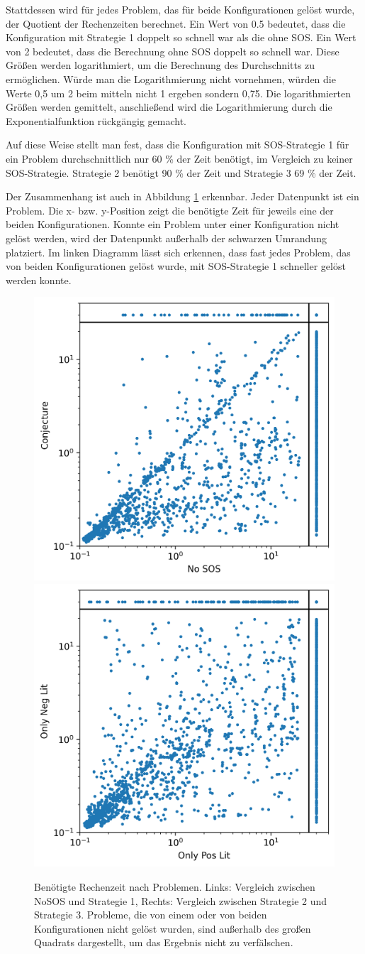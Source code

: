 		Stattdessen wird für jedes Problem, das für beide Konfigurationen gelöst wurde, der Quotient der Rechenzeiten berechnet. Ein Wert von 0.5 bedeutet, dass die Konfiguration mit Strategie 1 doppelt so schnell war als die ohne SOS. Ein Wert von 2 bedeutet, dass die Berechnung ohne SOS doppelt so schnell war. Diese Größen werden logarithmiert, um die Berechnung des Durchschnitts zu ermöglichen. Würde man die Logarithmierung nicht vornehmen, würden die Werte 0,5 um 2 beim mitteln nicht 1 ergeben sondern 0,75. Die logarithmierten Größen werden gemittelt, anschließend wird die Logarithmierung durch die Exponentialfunktion rückgängig gemacht.
		
		Auf diese Weise stellt man fest, dass die Konfiguration mit SOS-Strategie 1 für ein Problem durchschnittlich nur 60 \% der Zeit benötigt, im Vergleich zu keiner SOS-Strategie. Strategie 2 benötigt 90 \% der Zeit und Strategie 3 69 \% der Zeit.
		
		
		Der Zusammenhang ist auch in Abbildung \ref{fig:directcompare} erkennbar. Jeder Datenpunkt ist ein Problem. Die x- bzw. y-Position zeigt die benötigte Zeit für jeweils eine der beiden Konfigurationen. Konnte ein Problem unter einer Konfiguration nicht gelöst werden, wird der Datenpunkt außerhalb der schwarzen Umrandung platziert. Im linken Diagramm lässt sich erkennen, dass fast jedes Problem, das von beiden Konfigurationen gelöst wurde, mit SOS-Strategie 1 schneller gelöst werden konnte.
		
		
		\begin{figure}
			\centering
			\includegraphics[width=0.45\linewidth]{images/Diagram/directCompare1_2}
			\includegraphics[width=0.45\linewidth]{images/Diagram/directCompare2_3}
			\caption{Benötigte Rechenzeit nach Problemen. Links: Vergleich zwischen NoSOS und Strategie 1, Rechts: Vergleich zwischen Strategie 2 und Strategie 3. Probleme, die von einem oder von beiden Konfigurationen nicht gelöst wurden, sind außerhalb des großen Quadrats dargestellt, um das Ergebnis nicht zu verfälschen.}
			\label{fig:directcompare}
		\end{figure}
	
